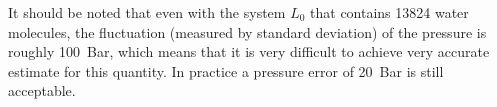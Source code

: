 \documentclass[a4paper,preprint,unsortedaddress,onecolumn,fleqn]{revtex4}
\newcommand{\eps}{\varepsilon}
\newcommand{\recheck}[1]{{\color{red} #1}}
\newcommand{\systemmb}{M_1}
\newcommand{\systemlb}{L_1}
\begin{document}
\recheck{It should be noted that even with the system $L_0$ that contains 13824 water molecules}, the
fluctuation (measured by standard deviation) of the pressure is roughly
100~Bar, which means that it is very difficult to achieve very accurate
estimate for this quantity. In practice a pressure error of 20~Bar is still
acceptable.



\end{document}
